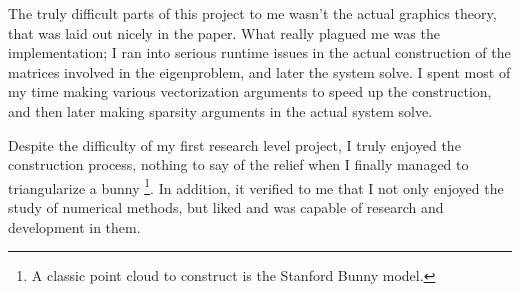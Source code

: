 \documentclass[12pt]{article}
\begin{document}
The truly difficult parts of this project to me wasn't the actual graphics
theory, that was laid out nicely in the paper. What really plagued me was the
implementation; I ran into serious runtime issues in the actual construction of
the matrices involved in the eigenproblem, and later the system solve. I spent
most of my time making various vectorization arguments to speed up the
construction, and then later making sparsity arguments in the actual system
solve. 

Despite the difficulty of my first research level project, I truly enjoyed the
construction process, nothing to say of the relief when I finally managed to
triangularize a bunny \footnote{A classic point cloud to construct is the
Stanford Bunny model.}. In addition, it verified to me that I not only enjoyed
the study of numerical methods, but liked and was capable of research and
development in them.
\end{document}
